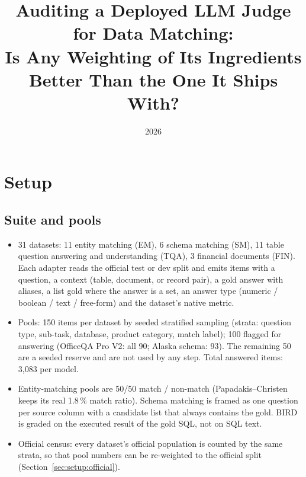 \documentclass[11pt]{article}
\title{Auditing a Deployed LLM Judge for Data Matching:\\Is Any Weighting of Its Ingredients Better Than the One It Ships With?}
\author{}
\date{2026}
\begin{document}
\maketitle

\section{Setup}
\label{sec:setup}

\subsection{Suite and pools}
\begin{itemize}
\item 31 datasets: 11 entity matching (EM), 6 schema matching (SM), 11 table question answering and understanding (TQA), 3 financial documents (FIN). Each adapter reads the official test or dev split and emits items with a question, a context (table, document, or record pair), a gold answer with aliases, a list gold where the answer is a set, an answer type (numeric / boolean / text / free-form) and the dataset's native metric.
\item Pools: 150 items per dataset by seeded stratified sampling (strata: question type, sub-task, database, product category, match label); 100 flagged for answering (OfficeQA Pro V2: all 90; Alaska schema: 93). The remaining 50 are a seeded reserve and are not used by any step. Total answered items: 3,083 per model.
\item Entity-matching pools are 50/50 match / non-match (Papadakis--Christen keeps its real 1.8\,\% match ratio). Schema matching is framed as one question per source column with a candidate list that always contains the gold. BIRD is graded on the executed result of the gold SQL, not on SQL text.
\item Official census: every dataset's official population is counted by the same strata, so that pool numbers can be re-weighted to the official split (Section~\ref{sec:setup:official}).
\end{itemize}
\end{document}
